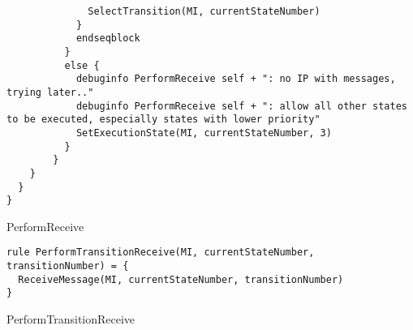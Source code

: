 \begin{listing}[H]
\begin{verbatim}
              SelectTransition(MI, currentStateNumber)
            }
            endseqblock
          }
          else {
            debuginfo PerformReceive self + ": no IP with messages, trying later.."
            debuginfo PerformReceive self + ": allow all other states to be executed, especially states with lower priority"
            SetExecutionState(MI, currentStateNumber, 3)
          }
        }
    }
  }
}
\end{verbatim}
\caption{PerformReceive}
\label{lst:asm:PerformReceive}
\end{listing}




\begin{listing}[H]
\begin{verbatim}
rule PerformTransitionReceive(MI, currentStateNumber, transitionNumber) = {
  ReceiveMessage(MI, currentStateNumber, transitionNumber)
}
\end{verbatim}
\caption{PerformTransitionReceive}
\label{lst:asm:PerformTransitionReceive}
\end{listing}




